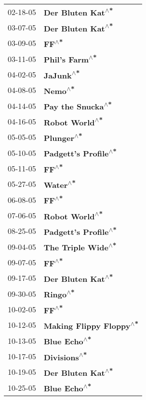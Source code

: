 \begin{supertabular}{p{0.25\columnwidth}p{0.75\columnwidth}}
 02-18-05 &        \textbf{Der Bluten Kat\textsuperscript{$\wedge$*}} \\
 03-07-05 &        \textbf{Der Bluten Kat\textsuperscript{$\wedge$*}} \\
 03-09-05 &                    \textbf{FF\textsuperscript{$\wedge$*}} \\
 03-11-05 &           \textbf{Phil's Farm\textsuperscript{$\wedge$*}} \\
 04-02-05 &                \textbf{JaJunk\textsuperscript{$\wedge$*}} \\
 04-08-05 &                  \textbf{Nemo\textsuperscript{$\wedge$*}} \\
 04-14-05 &        \textbf{Pay the Snucka\textsuperscript{$\wedge$*}} \\
 04-16-05 &           \textbf{Robot World\textsuperscript{$\wedge$*}} \\
 05-05-05 &               \textbf{Plunger\textsuperscript{$\wedge$*}} \\
 05-10-05 &     \textbf{Padgett's Profile\textsuperscript{$\wedge$*}} \\
 05-11-05 &                    \textbf{FF\textsuperscript{$\wedge$*}} \\
 05-27-05 &                 \textbf{Water\textsuperscript{$\wedge$*}} \\
 06-08-05 &                    \textbf{FF\textsuperscript{$\wedge$*}} \\
 07-06-05 &           \textbf{Robot World\textsuperscript{$\wedge$*}} \\
 08-25-05 &     \textbf{Padgett's Profile\textsuperscript{$\wedge$*}} \\
 09-04-05 &       \textbf{The Triple Wide\textsuperscript{$\wedge$*}} \\
 09-07-05 &                    \textbf{FF\textsuperscript{$\wedge$*}} \\
 09-17-05 &        \textbf{Der Bluten Kat\textsuperscript{$\wedge$*}} \\
 09-30-05 &                 \textbf{Ringo\textsuperscript{$\wedge$*}} \\
 10-02-05 &                    \textbf{FF\textsuperscript{$\wedge$*}} \\
 10-12-05 &  \textbf{Making Flippy Floppy\textsuperscript{$\wedge$*}} \\
 10-13-05 &             \textbf{Blue Echo\textsuperscript{$\wedge$*}} \\
 10-17-05 &             \textbf{Divisions\textsuperscript{$\wedge$*}} \\
 10-19-05 &        \textbf{Der Bluten Kat\textsuperscript{$\wedge$*}} \\
 10-25-05 &             \textbf{Blue Echo\textsuperscript{$\wedge$*}} \\
\end{supertabular}
